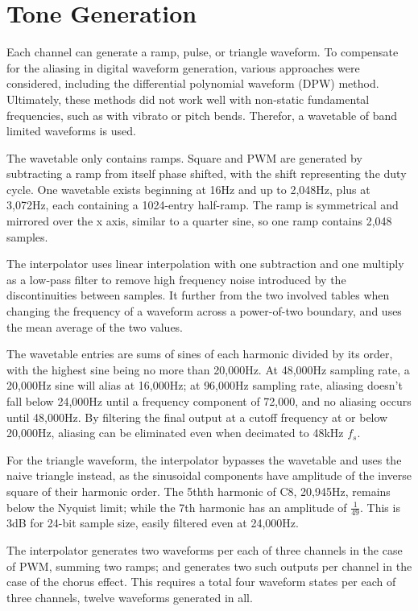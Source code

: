 \section{Tone Generation}

Each channel can generate a ramp, pulse, or triangle waveform.  To compensate for the aliasing in digital waveform generation, various approaches were considered, including the differential polynomial waveform (DPW) method\autocite{Valimaki2010}.  Ultimately, these methods did not work well with non-static fundamental frequencies, such as with vibrato or pitch bends.  Therefor, a wavetable of band limited waveforms is used.

The wavetable only contains ramps.  Square and PWM are generated by subtracting a ramp from itself phase shifted, with the shift representing the duty cycle.  One wavetable exists beginning at 16Hz and up to 2,048Hz, plus at 3,072Hz, each containing a 1024-entry half-ramp.  The ramp is symmetrical and mirrored over the x axis, similar to a quarter sine, so one ramp contains 2,048 samples.

The interpolator uses linear interpolation with one subtraction and one multiply as a low-pass filter to remove high frequency noise introduced by the discontinuities between samples.  It further from the two involved tables when changing the frequency of a waveform across a power-of-two boundary, and uses the mean average of the two values.

The wavetable entries are sums of sines of each harmonic divided by its order, with the highest sine being no more than 20,000Hz.  At 48,000Hz sampling rate, a 20,000Hz sine will alias at 16,000Hz; at 96,000Hz sampling rate, aliasing doesn't fall below 24,000Hz until a frequency component of 72,000, and no aliasing occurs until 48,000Hz.  By filtering the final output at a cutoff frequency at or below 20,000Hz, aliasing can be eliminated even when decimated to 48kHz $f_s$.

For the triangle waveform, the interpolator bypasses the wavetable and uses the naive triangle instead, as the sinusoidal components have amplitude of the inverse square of their harmonic order.  The 5thth harmonic of C8, 20,945Hz, remains below the Nyquist limit; while the 7th harmonic has an amplitude of $\frac{1}{49}$.  This is 3dB for 24-bit sample size, easily filtered even at 24,000Hz.

The interpolator generates two waveforms per each of three channels in the case of PWM, summing two ramps; and generates two such outputs per channel in the case of the chorus effect.  This requires a total four waveform states per each of three channels, twelve waveforms generated in all.

